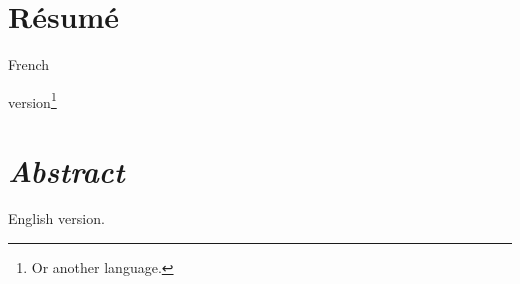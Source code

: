 \chapter*{\centering\vfill Résumé}

\ignore{\og} French\ignore{\fg{}} version\footnote{Or another language.} %

\vfill

\begingroup
\let\clearpage\relax

\chapter*{\centering \emph{Abstract}}

\begin{itshape}
English version.

\end{itshape}
\endgroup
\vfill